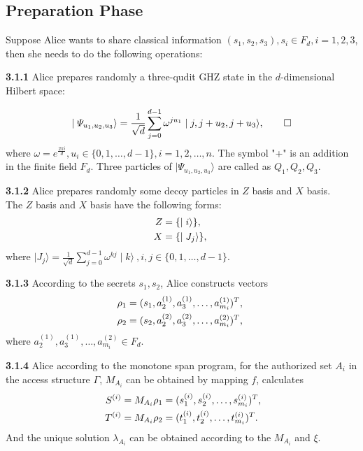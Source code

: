 \documentclass[pdflatex,sn-mathphys]{sn-jnl}%
\theoremstyle{thmstyleone}%
\theoremstyle{thmstyletwo}%
\theoremstyle{thmstylethree}%
\begin{document}
\subsection{Preparation Phase}\label{subsec1}

Suppose Alice wants to share classical information $(s_1,s_2,s_3), s_i\in F_d, i=1,2,3$, then she needs to do the following operations:

\indent\textbf{3.1.1} Alice prepares randomly a three-qudit GHZ state in the $d$-dimensional Hilbert space:

\[\mid\varPsi_{{u_1},{u_2},{u_3}}\rangle=\frac{1}{\sqrt{d}}\sum_{j=0}^{d-1} \omega^{j{u_1}}\mid{j,j+{u_2,j+u_3}}\rangle,\qedhere\]
where $\omega=e^\frac{2\pi i}{d},u_i\in\lbrace0,1,\dots,d-1\rbrace, i=1,2,\dots,n$. The symbol "+" is an addition in the finite field $F_d$. Three particles of $\mid\varPsi_{{u_1},{u_2},{u_3}}\rangle$ are called as $Q_1,Q_2,Q_3$.

\indent\textbf{3.1.2} Alice prepares randomly some decoy particles in $Z$ basis and $X$ basis.\\
The $Z$ basis and $X$ basis have the following forms:
\begin{align}
 Z &=\lbrace\mid i\rangle\rbrace,\notag\\
 X &=\lbrace\mid J_j\rangle\rbrace,\notag\
\end{align}
where $\mid J_j\rangle=\frac{1}{\sqrt{d}}\sum_{j=0}^{d-1}\omega^{kj}\mid{k}\rangle\ ,i,j \in \lbrace0,1,\dots,d-1\rbrace $.

\indent\textbf{3.1.3} According to the secrets $s_1, s_2$, Alice constructs vectors
\begin{align}
 \rho_1 &=(s_1,a_2^{(1)},a_3^{(1)},\dots,a_{m_i}^{(1)})^T,\notag\\
 \rho_2 &=(s_2,a_2^{(2)},a_3^{(2)},\dots,a_{m_i}^{(2)})^T,\notag\
\end{align}
where $a_2^{(1)},a_3^{(1)},\dots,a_{m_i}^{(2)}\in F_d $.

\indent\textbf{3.1.4} Alice according to the monotone span program, for the authorized set $A_i$ in the access structure $\varGamma$, $M_{A_i}$ can be obtained by mapping $f$, calculates
\begin{align}
 \ S^{(i)} &=M_{A_i}\rho_1=(s_1^{(i)},s_2^{(i)},\dots,s_{m_i}^{(i)})^T,\notag\\
 \ T^{(i)} &=M_{A_i}\rho_2=(t_1^{(i)},t_2^{(i)},\dots,t_{m_i}^{(i)})^T.\notag\
\end{align}
And the unique solution $\lambda_{A_i}$ can be obtained according to the $M_{A_i}$ and $\xi$.
\end{document}
